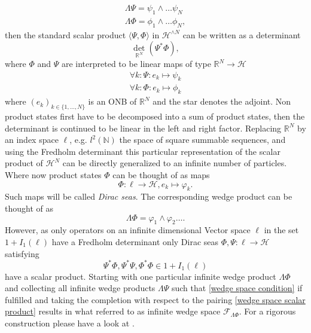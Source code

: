 \documentclass[b5paper,draft,openbib,12pt]{memoir}
\begin{document}
\begin{align}
  \mathsf{\Lambda}\Psi= \psi_1\wedge \dots \psi_N\\
  \mathsf{\Lambda}\Phi=\phi_1\wedge \dots \phi_N,
\end{align}
then the standard scalar product \(\langle \Psi,\Phi\rangle\)
in \(\mathcal{H}^{\wedge N}\) can be written as a determinant
\begin{equation}\label{wedge space scalar product}
  \det_{\mathbb{R}^N} (\Psi^* \Phi),
\end{equation}
where \(\Phi\) and \(\Psi\) are interpreted to be linear maps
of type \(\mathbb{R}^N\rightarrow \mathcal{H}\) 
\begin{align}
  \forall k: \Psi: e_k \mapsto \psi_k\\
  \forall k: \Phi: e_k \mapsto \phi_k
\end{align}
where \((e_k)_{k\in\{1,\dots, N\}}\) is an ONB 
of \(\mathbb{R}^N\) and the star denotes the adjoint. Non 
product states first have to be decomposed into a sum of 
product states, then the determinant is continued to be 
linear in the left and right factor. Replacing 
\(\mathbb{R}^N\) by an index space \(\ell\), e.g. \(l^2(\mathbb{N})\)
the space of square summable sequences,  and
using the Fredholm 
determinant this particular 
representation of the scalar product of \(\mathcal{H}^N\)
can be directly generalized to an infinite number of particles. 
Where now product states \(\Phi\) can be thought of as maps
\begin{equation}
  \Phi: \ell \rightarrow \mathcal{H}, e_k\mapsto \varphi_k.
\end{equation}
Such maps will be called \emph{Dirac seas}.
The corresponding wedge product can be thought of as 
\begin{equation}
  \mathsf{\Lambda}\Phi=\varphi_1\wedge \varphi_2\dots .
\end{equation}
However, as only operators on an infinite dimensional 
Vector space \(\mathcal{\ell}\) in the set \(1+I_1(\mathcal{\ell})\) 
have a Fredholm determinant only Dirac seas 
\(\Phi,\Psi: \ell \rightarrow \mathcal{H}\) satisfying
\begin{equation}\label{wedge space condition}
\Psi^*\Phi,\Psi^*\Psi,\Phi^*\Phi\in 1+I_1(\ell)
\end{equation}
have a scalar product. 
Starting with one particular 
infinite wedge product \(\mathsf{\Lambda}\Phi\) and collecting all infinite 
wedge products \(\mathsf{\Lambda}\Psi\) such that \eqref{wedge space condition}
if fulfilled and taking the completion with respect to 
the pairing \eqref{wedge space scalar product} results in 
what referred to as infinite wedge space 
\(\mathcal{F}_{\mathsf{\Lambda} \Phi}\). For a rigorous construction 
please have a look at \cite[section 2.1]{ivp0}. 
\end{document}

